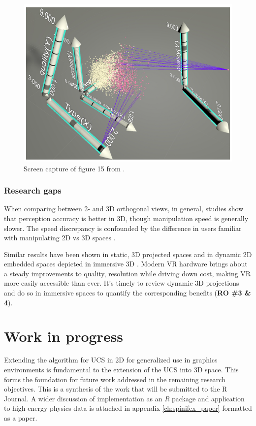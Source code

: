 \documentclass{monashthesis}
\begin{document}
\begin{figure}

{\centering \includegraphics[width=0.5\linewidth]{./figures/cordeil2017fig} 

}

\caption{Screen capture of figure 15 from
\textcite{cordeil_imaxes:_2017}.}\label{fig:cordeil2017fig}
\end{figure}

\subsection{Research gaps}\label{research-gaps-1}

When comparing between 2- and 3D orthogonal views, in general, studies
show that perception accuracy is better in 3D, though manipulation speed
is generally slower. The speed discrepancy is confounded by the
difference in users familiar with manipulating 2D vs 3D spaces
\autocites{lee_effects_1986}{wickens_implications_1994}{tory_visualization_2006}[counterexample][]{sedlmair_empirical_2013}.

Similar results have been shown in static, 3D projected spaces
\autocites{gracia_new_2016}{wagner_filho_immersive_2018} and in dynamic
2D embedded spaces depicted in immersive 3D
\autocite{nelson_xgobi_1998}. Modern VR hardware brings about a steady
improvements to quality, resolution while driving down cost, making VR
more easily accessible than ever. It's timely to review dynamic 3D
projections and do so in immersive spaces to quantify the corresponding
benefits (\textbf{RO \#3 \& 4}).

\chapter{Work in progress}\label{ch:workinprogress}

Extending the algorithm for UCS in 2D for generalized use in graphics
environments is fundamental to the extension of the UCS into 3D space.
This forms the foundation for future work addressed in the remaining
research objectives. This is a synthesis of the work that will be
submitted to the R Journal. A wider discussion of implementation as an
\emph{R} package and application to high energy physics data
\autocites{wang_visualizing_2018}{cook_dynamical_2018} is attached in
appendix \ref{ch:spinifex_paper} formatted as a paper.
\end{document}
